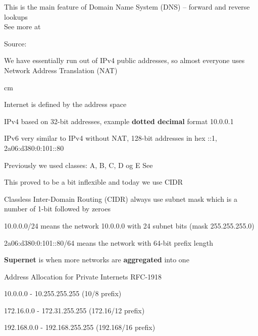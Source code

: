 \documentclass[Screen16to9,17pt]{foils}
\begin{document}
This is the main feature of Domain Name System (DNS) -- forward and reverse lookups\\
See more at 



Source: 

We have essentially run out of IPv4 public addresses, so almost everyone uses Network Address Translation (NAT)



 cm

\begin{list2}
\item Internet is defined by the address space
\item IPv4 based on 32-bit addresses, example \textbf{dotted decimal} format 10.0.0.1
\item IPv6 very similar to IPv4 without NAT, 128-bit addresses in hex ::1, 2a06:d380:0:101::80
\end{list2}




\begin{list2}
\item Previously we used classes: A, B, C, D og E
See 
\item This proved to be a bit inflexible and today we use CIDR
\item Classless Inter-Domain Routing (CIDR) always use subnet mask which is a number of 1-bit followed by zeroes
\item 10.0.0.0/24 means the network 10.0.0.0 with 24 subnet bits (mask 255.255.255.0)
\item 2a06:d380:0:101::80/64 means the network with 64-bit prefix length
\item \textbf{Supernet} is when more networks are \textbf{aggregated} into one
\end{list2}



Address Allocation for Private Internets RFC-1918
\begin{list2}
\item 10.0.0.0    -  10.255.255.255  (10/8 prefix)
\item 172.16.0.0  -  172.31.255.255  (172.16/12 prefix)
\item 192.168.0.0 -  192.168.255.255 (192.168/16 prefix)
\end{list2}
\end{document}

